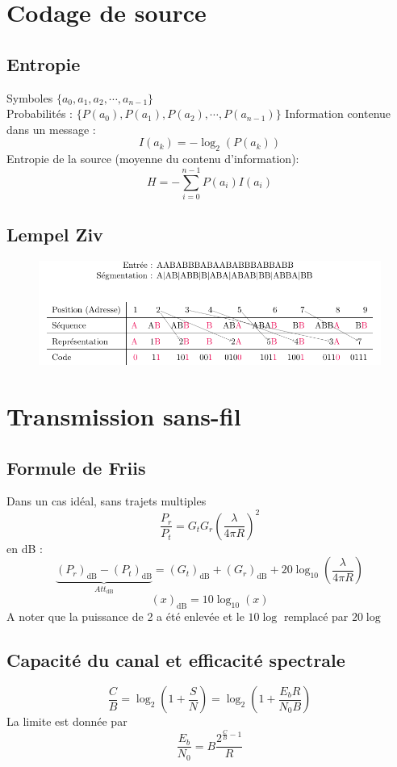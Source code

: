 \documentclass[]{article}
\begin{document}
\begin{multicols}{3}
\section{Codage de source}
\subsection{Entropie}
Symboles $\lbrace a_0, a_1, a_2, \cdots, a_{n-1}\rbrace$\\
Probabilités : $\lbrace P(a_0), P(a_1), P(a_2), \cdots, P(a_{n-1})\rbrace$
Information contenue dans un message :
$$I(a_k)=-\log_2(P(a_k))$$
Entropie de la source (moyenne du contenu d'information):
$$H=-\sum_{i=0}^{n-1}P(a_i)I(a_i)$$



\subsection{Lempel Ziv}
\begin{figure}[H]
\centering
\includegraphics[width=\columnwidth]{drwg_0.pdf}
\end{figure}




\section{Transmission sans-fil}
\subsection{Formule de Friis}
Dans un cas idéal, sans trajets multiples
$$\frac{P_r}{P_t}=G_tG_r\left(\frac{\lambda}{4\pi R}\right)^2$$
en \si{\deci\bel} : 
$$\underbrace{(P_r)_{\si{\deci\bel}}-(P_t)_{\si{\deci\bel}}}_{Att_{\si{\deci\bel}}}=(G_t)_{\si{\deci\bel}}+(G_r)_{\si{\deci\bel}}+20\log_{10}\left(\frac{\lambda}{4\pi R}\right)$$
$$(x)_{\si{\deci\bel}}=10\log_{10}(x)$$
A noter que la puissance de 2 a été enlevée et le $10\log$ remplacé par $20\log$
\subsection{Capacité du canal et efficacité spectrale}
$$\frac{C}{B}=\log_2\left(1+\frac{S}{N}\right)=\log_2\left(1+\frac{E_bR}{N_0B}\right)$$
La limite est donnée par
$$\frac{E_b}{N_0}=B\frac{2^{\frac{C}{B}-1}}{R}$$

\end{multicols}
\end{document}
